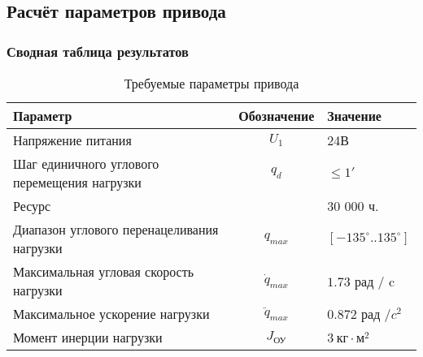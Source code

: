 \subsection{Расчёт параметров привода}



\subsubsection{Сводная таблица результатов}

\begin{table}[h!]
    \centering
    \begin{tabular}{|l|c|l|}
        \hline
        Параметр                                    & Обозначение      & Значение                           \\
        \hline
        Напряжение питания                          & $U_1$            & 24В                                \\
        Шаг единичного углового перемещения нагрузки& $q_d$            & $ \le 1' $                         \\
        Ресурс                                      &                  & 30 000 ч.                          \\
        Диапазон углового перенацеливания нагрузки  & $q_{max}$        & $[-135^\circ .. 135^\circ] $       \\
        Максимальная угловая скорость нагрузки      & $\dot{q}_{max}$  & $1.73$ рад / c                     \\
        Максимальное ускорение нагрузки             & $\ddot{q}_{max}$ & $0.872$ рад /$c^2$                 \\
        Момент инерции нагрузки                     & $J_{\text{ОУ}}$  & $3 ~\text{кг} \cdot \text{м}^2 $   \\
        \hline
    \end{tabular}
    \caption{Требуемые параметры привода}
    \label{drive_parameters_tbl}
\end{table}

\endinput
